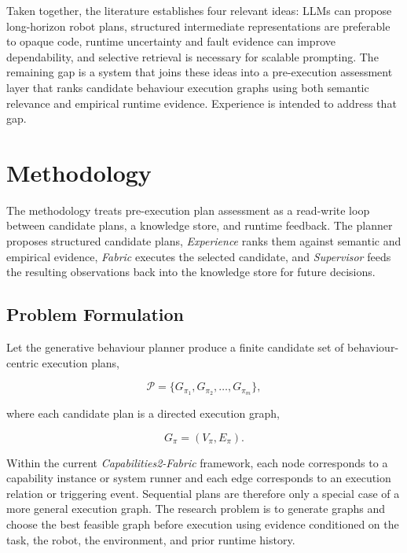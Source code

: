 \documentclass[letterpaper, 10pt, conference]{ieeeconf}
\begin{document}
Taken together, the literature establishes four relevant ideas: LLMs can propose long-horizon robot plans, structured intermediate representations are preferable to opaque code, runtime uncertainty and fault evidence can improve dependability, and selective retrieval is necessary for scalable prompting. The remaining gap is a system that joins these ideas into a pre-execution assessment layer that ranks candidate behaviour execution graphs using both semantic relevance and empirical runtime evidence. Experience is intended to address that gap.

\section{Methodology}

The methodology treats pre-execution plan assessment as a read-write loop between candidate plans, a knowledge store, and runtime feedback. The planner proposes structured candidate plans, \textit{Experience} ranks them against semantic and empirical evidence, \textit{Fabric} executes the selected candidate, and \textit{Supervisor} feeds the resulting observations back into the knowledge store for future decisions.

\subsection{Problem Formulation}

Let the generative behaviour planner produce a finite candidate set of behaviour-centric execution plans,

\begin{equation}
\mathcal{P}=\{G_{\pi_1}, G_{\pi_2}, \ldots, G_{\pi_m}\},
\end{equation}

where each candidate plan is a directed execution graph,

\begin{equation}
G_{\pi}=(V_{\pi}, E_{\pi}).
\end{equation}

Within the current \textit{Capabilities2-Fabric} framework, each node corresponds to a capability instance or system runner and each edge corresponds to an execution relation or triggering event. Sequential plans are therefore only a special case of a more general execution graph. The research problem is to generate graphs and choose the best feasible graph before execution using evidence conditioned on the task, the robot, the environment, and prior runtime history.
\end{document}
